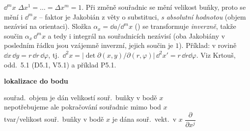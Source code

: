 \begin{vysvetleni}
$\dd^m x$  $\Delta x^1=\dots=\Delta x^m=1$. Při změně souřadnic se mění velikost buňky,
proto se mění i $\dd^m x$ -- faktor je Jakobián z věty o substituci, \emph{s absolutní hodnotou} (objem nezávisí na orientaci).
Složka $\alpha_x = \dd a/\dd^m x$ () se transformuje \emph{inverzně}, takže součin $\alpha_x\,\dd^m x$
a tedy i integrál na souřadnicích nezávisí (oba Jakobiány v posledním řádku jsou vzájemně inverzní, jejich součin je $1$).
Příklad: v rovině $\dd x\,\dd y = r\,\dd r\,\dd\varphi$, tj.\ $\dd^2x = |\det\partial(x,y)/\partial(r,\varphi)|\,\dd^2x' = r\,\dd r\dd\varphi$.
Viz Krtouš, odd.~5.1 (D5.1, V5.1) a příklad P5.1.
\end{vysvetleni}

\providecommand{\gmIhustsym}{\mathord{\text{\tikz[baseline=0.04cm,line width=0.55pt,line join=round]{\draw (0,0.075)--(0.07,0.15)--(0.32,0.15)--(0.28,0.075)--(0.32,0)--(0.07,0)--cycle;}}}}
\providecommand{\gmIhustsymB}{\mathord{\text{\tikz[baseline=0.04cm,line width=0.55pt,line join=round]{\draw (0.32,0.075)--(0.25,0.15)--(0,0.15)--(0.04,0.075)--(0,0)--(0.25,0)--cycle;}}}}
\providecommand{\gmIbazhust}{\mathord{\text{\tikz[baseline=0.04cm,line width=0.55pt,line join=round]{\draw (0,0.075)--(0.07,0.15)--(0.27,0.15)--(0.32,0.075)--(0.27,0)--(0.07,0)--cycle; \draw (0.03,0.075)--(0.32,0.075);}}}}
\providecommand{\gmIhdual}{\mathord{\divideontimes}}

\textbf{lokalizace do bodu}

souřad.\ objem je dán velikostí souř.\ buňky v bodě $x$ \\
nepotřebujeme ale pokračování souřadnic mimo bod $x$ \\
tvar/velikost souř.\ buňky v bodě $x$ je dána souř.\ vekt.\ v $x$ \quad $\dfrac{\partial}{\partial x^j}$

\begin{center}
\end{center}

